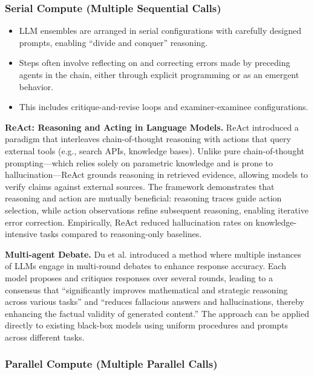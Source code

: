 \documentclass[12pt]{article}
\begin{document}
\subsubsection{Serial Compute (Multiple Sequential Calls)}

\begin{itemize}
    \item LLM ensembles are arranged in serial configurations with carefully designed prompts, enabling ``divide and conquer'' reasoning.
    \item Steps often involve reflecting on and correcting errors made by preceding agents in the chain, either through explicit programming or as an emergent behavior.
    \item This includes critique-and-revise loops and examiner-examinee configurations.
\end{itemize}

\textbf{ReAct: Reasoning and Acting in Language Models.} ReAct \cite{yao2023react} introduced a paradigm that interleaves chain-of-thought reasoning with actions that query external tools (e.g., search APIs, knowledge bases). Unlike pure chain-of-thought prompting---which relies solely on parametric knowledge and is prone to hallucination---ReAct grounds reasoning in retrieved evidence, allowing models to verify claims against external sources. The framework demonstrates that reasoning and action are mutually beneficial: reasoning traces guide action selection, while action observations refine subsequent reasoning, enabling iterative error correction. Empirically, ReAct reduced hallucination rates on knowledge-intensive tasks compared to reasoning-only baselines.

\textbf{Multi-agent Debate.} Du et al. \cite{du2023multiagentdebate} introduced a method where multiple instances of LLMs engage in multi-round debates to enhance response accuracy. Each model proposes and critiques responses over several rounds, leading to a consensus that ``significantly improves mathematical and strategic reasoning across various tasks'' and ``reduces fallacious answers and hallucinations, thereby enhancing the factual validity of generated content.'' The approach can be applied directly to existing black-box models using uniform procedures and prompts across different tasks.

\subsubsection{Parallel Compute (Multiple Parallel Calls)}
\end{document}
